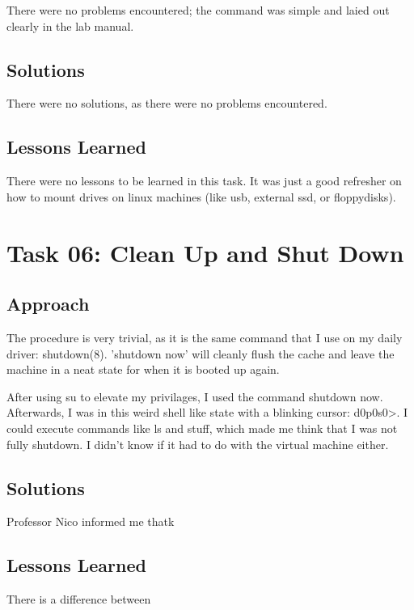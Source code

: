 \documentclass[11pt]{article}
\begin{document}
There were no problems encountered; the command was simple and laied out clearly in the lab manual.

\subsection*{Solutions}
There were no solutions, as there were no problems encountered.

\subsection*{Lessons Learned}
There were no lessons to be learned in this task. It was just a good refresher on how to mount drives on linux machines (like usb, external ssd, or floppydisks).

\section{Task 06: Clean Up and Shut Down}
\subsection*{Approach}
The procedure is very trivial, as it is the same command that I use on my daily driver: shutdown(8). 'shutdown now' will cleanly flush the cache and leave the machine in a neat state for when it is booted up again.

After using su to elevate my privilages, I used the command shutdown now. Afterwards, I was in this weird shell like state with a blinking cursor: d0p0s0>. I could execute commands like ls and stuff, which made me think that I was not fully shutdown. I didn't know if it had to do with the virtual machine either.

\subsection*{Solutions}
Professor Nico informed me thatk

\subsection*{Lessons Learned}
There is a difference between
\end{document}

